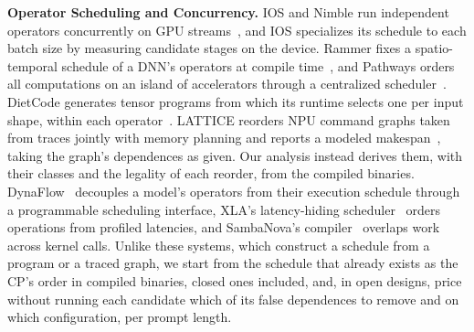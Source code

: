 \textbf{Operator Scheduling and Concurrency.}
IOS and Nimble run independent operators concurrently on GPU streams~\citep{ding2021ios,kwon2020nimble}, and IOS specializes its schedule to each batch size by measuring candidate stages on the device.
Rammer fixes a spatio-temporal schedule of a DNN's operators at compile time~\citep{ma2020rammer}, and Pathways orders all computations on an island of accelerators through a centralized scheduler~\citep{barham2022pathways}.
DietCode generates tensor programs from which its runtime selects one per input shape, within each operator~\citep{zheng2022dietcode}.
LATTICE reorders NPU command graphs taken from traces jointly with memory planning and reports a modeled makespan~\citep{liu2026lattice}, taking the graph's dependences as given.
Our analysis instead derives them, with their classes and the legality of each reorder, from the compiled binaries.
DynaFlow~\citep{pan2026dynaflow} decouples a model's operators from their execution schedule through a programmable scheduling interface, XLA's latency-hiding scheduler~\citep{jax-pgle} orders operations from profiled latencies, and SambaNova's compiler~\citep{gandhi2026dataflow} overlaps work across kernel calls.
Unlike these systems, which construct a schedule from a program or a traced graph, we start from the schedule that already exists as the CP's order in compiled binaries, closed ones included, and, in open designs, price without running each candidate which of its false dependences to remove and on which configuration, per prompt length.

